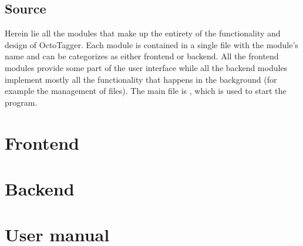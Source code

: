 \subsection{Source}
Herein lie all the modules that make up the entirety of the functionality and
design of OctoTagger. Each module is contained in a single file with the
module's name and can be categorizes as either frontend or backend. All the
frontend modules provide some part of the user interface while all the backend
modules implement mostly all the functionality that happens in the background
(for example the management of files). The main file is ,
which is used to start the program.



\section{Frontend}













\section{Backend}














\section{User manual}
\def\kapitelautor{Julian Lorenz}


